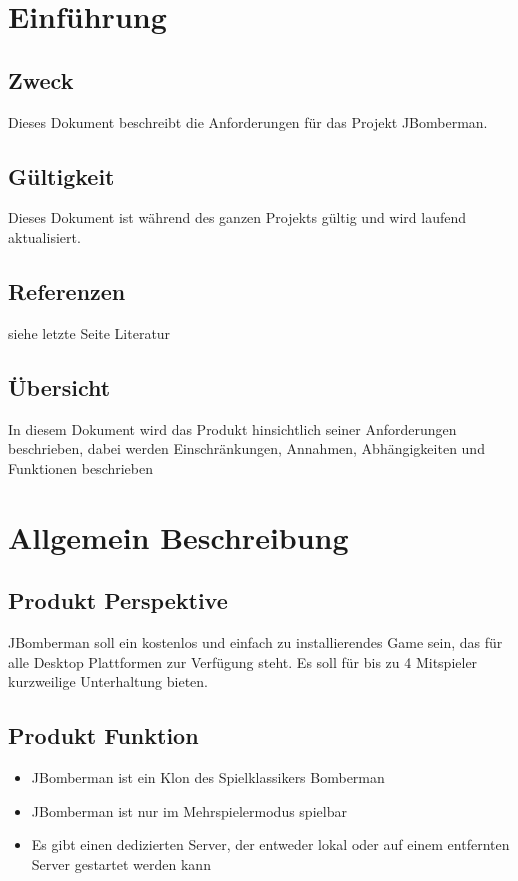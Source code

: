 \documentclass[11pt]{scrartcl}
\begin{document}
\newpage
\tableofcontents
\newpage
\section{Einführung}
\label{sec:Einführung}
\subsection{Zweck}
\label{sec:Zweck}
Dieses Dokument beschreibt die Anforderungen für das Projekt JBomberman.
\subsection{Gültigkeit}
\label{sec:Gültigkeit}
Dieses Dokument ist während des ganzen Projekts gültig und wird laufend aktualisiert.
\subsection{Referenzen}
\label{sec:Referenzen}
siehe letzte Seite Literatur

\subsection{Übersicht}
\label{sec:Übersicht}
In diesem Dokument wird das Produkt hinsichtlich seiner Anforderungen beschrieben, dabei werden Einschränkungen, Annahmen, Abhängigkeiten und Funktionen beschrieben

\section{Allgemein Beschreibung}
\label{sec:Allgemeine Beschreibung}

\subsection{Produkt Perspektive}
\label{sec:Produkt Perspektive}
JBomberman soll ein kostenlos und einfach zu installierendes Game sein, das für alle Desktop Plattformen zur Verfügung steht.
Es soll für bis zu 4 Mitspieler kurzweilige Unterhaltung bieten.
\subsection{Produkt Funktion}
\label{sec:Produkt Funktion}
\begin{itemize}
    \item JBomberman ist ein Klon des Spielklassikers Bomberman
    \item JBomberman ist nur im Mehrspielermodus spielbar
    \item Es gibt einen dedizierten Server, der entweder lokal oder auf einem entfernten Server gestartet werden kann
\end{itemize}
\end{document}
